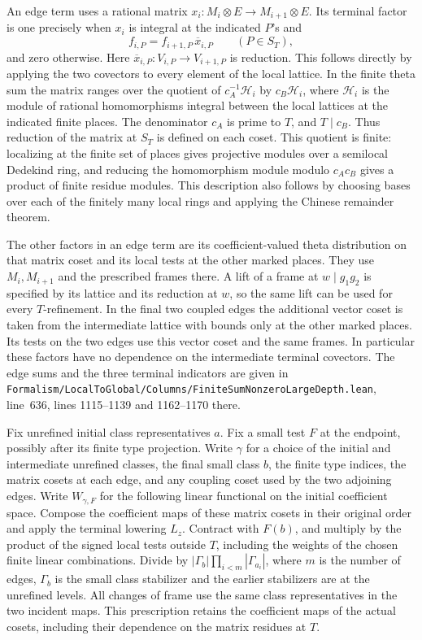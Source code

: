 \documentclass[a4paper,11pt]{article}
\theoremstyle{definition}
\theoremstyle{remark}
\newcommand{\srcloc}[2]{{\small\nolinkurl{#1.lean}}, line~#2}
\numberwithin{equation}{section}
\begin{document}
An edge term uses a rational matrix \(x_i:M_i\otimes E\to
M_{i+1}\otimes E\). Its terminal factor is one precisely when
\(x_i\) is integral at the indicated \(P\)'s and
\[
       f_{i,P}=f_{i+1,P}\,\overline{x}_{i,P}
                   \qquad(P\in S_T),
\]
and zero otherwise. Here \(\overline{x}_{i,P}:V_{i,P}\to V_{i+1,P}\)
is reduction. This follows directly by applying the two covectors
to every element of the local lattice. In the finite theta sum
the matrix ranges over the quotient of \(c_A^{-1}\mathcal H_i\)
by \(c_B\mathcal H_i\), where \(\mathcal H_i\) is the module of
rational homomorphisms integral between the local lattices at
the indicated finite places. The denominator \(c_A\) is prime
to \(T\), and \(T\mid c_B\). Thus reduction of the matrix at
\(S_T\) is defined on each coset. This quotient is finite:
localizing at the finite set of places gives projective modules
over a semilocal Dedekind ring, and reducing the homomorphism
module modulo \(c_Ac_B\) gives a product of finite residue
modules. This description also follows by choosing bases over
each of the finitely many local rings and applying the Chinese
remainder theorem.

The other factors in an edge term are its coefficient-valued
theta distribution on that matrix coset and its local tests at
the other marked places. They use \(M_i,M_{i+1}\) and the
prescribed frames there. A lift of a frame at \(w\mid g_1g_2\)
is specified by its lattice and its reduction at \(w\), so the
same lift can be used for every \(T\)-refinement. In the final
two coupled edges the additional vector coset is taken from the
intermediate lattice with bounds only at the other marked
places. Its tests on the two edges use this vector coset and
the same frames. In particular these factors have no dependence
on the intermediate terminal covectors. The edge sums and the
three terminal indicators are given in
\srcloc{Formalism/LocalToGlobal/Columns/FiniteSumNonzeroLargeDepth}{636},
lines 1115--1139 and 1162--1170 there.

Fix unrefined initial class representatives \(a\). Fix a small
test \(F\) at the endpoint, possibly after its finite type
projection. Write \(\gamma\) for a choice of the initial and
intermediate unrefined classes, the final small class \(b\), the
finite type indices, the matrix cosets at each edge, and any
coupling coset used by the two adjoining edges. Write
\(W_{\gamma,F}\) for the following linear functional on the
initial coefficient space. Compose the coefficient maps of these
matrix cosets in their original order and apply the terminal
lowering \(L_z\). Contract with \(F(b)\), and multiply by the
product of the signed local tests outside \(T\), including the
weights of the chosen finite linear combinations. Divide by
\(|\Gamma_b|\prod_{i<m}|\Gamma_{a_i}|\), where \(m\) is the
number of edges, \(\Gamma_b\) is the small class stabilizer and
the earlier stabilizers are at the unrefined levels. All changes
of frame use the same class representatives in the two incident
maps. This prescription retains the coefficient maps of the
actual cosets, including their dependence on the matrix residues
at \(T\).
\end{document}
